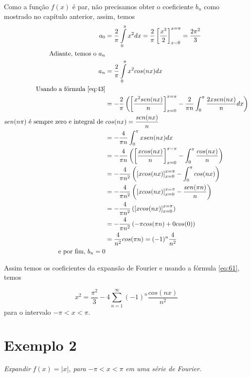 Como a função $f(x)$ é par, não precisamos obter o coeficiente $b_n$ como mostrado 
no capítulo anterior, assim, temos
\begin{equation}
\notag
    \begin{split}
        a_0 &= \dfrac{2}{\pi} \int\limits_{0}^{\pi}x^2 dx = \dfrac{2}{\pi}\left[\dfrac{x^3}{2}\right]_{x=0}^{x=\pi} = \dfrac{2\pi^2}{3}\\
        \text{Adiante, temos o }a_n &\\
        a_n &= \dfrac{2}{\pi} \int\limits_{0}^{\pi}x^2 cos(nx) dx\\
        \text{Usando a fórmula \ref{eq:43}}&\\
        &= -\dfrac{2}{\pi}\left( \left[\dfrac{x^2sen(nx)}{n}\right]_{x=0}^{x=\pi} - \dfrac{2}{\pi n}\int_{0}^{\pi}\dfrac{2x sen(nx)}{n}dx \right)\\
        sen(n\pi)\text{ é sempre zero e integral de }& cos(nx) = \dfrac{sen(nx)}{n}\\
        &= -\dfrac{4}{\pi n}\int_{0}^{\pi}x sen(nx)dx \\
        &= -\dfrac{4}{\pi n} \left(\left[\dfrac{x cos(nx)}{n}\right]_{x=0}^{x=\pi} - \int_{0}^{\pi}\dfrac{cos(nx)}{n} \right)\\
        &= -\dfrac{4}{\pi n^2} \left(\left[x cos(nx)\right]_{x=0}^{x=\pi} - \int_{0}^{\pi}cos(nx)\right)\\
        &= -\dfrac{4}{\pi n^2} \left(\left[x cos(nx)\right]_{x=0}^{x=\pi} - \dfrac{sen(\pi n)}{n}\right)\\
        &= -\dfrac{4}{\pi n^2} \left(\left[x cos(nx)\right]_{x=0}^{x=\pi}\right)\\
        &= -\dfrac{4}{\pi n^2} \left( - \pi cos(\pi n) + 0 cos(0) \right)\\
        &= \dfrac{4}{n^2}cos(\pi n) = (-1)^n \dfrac{4}{n^2}\\
        \text{e por fim, }b_n = 0 &
    \end{split}
\end{equation}

Assim temos os coeficientes da expansão de Fourier e usando a fórmula \ref{eq:61}, temos

\begin{equation}
\label{eq:exemplo1SF}
    x^2 = \dfrac{\pi^2}{3} - 4\sum\limits_{n=1}^{\infty}(-1)^n \dfrac{cos(nx)}{n^2}
\end{equation}
para o intervalo $ -\pi < x < \pi$.

\section*{Exemplo 2}
\textit{Expandir }$f(x) = |x|$\textit{, para }$-\pi < x < \pi$\textit{ em uma série de Fourier.}\\

